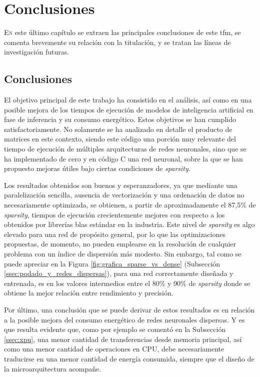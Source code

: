 \chapter{Conclusiones}
\label{chap:conclusiones}

\lettrine{E}{n} este último capítulo se extraen las principales conclusiones de este \acrlong{tfm}, se comenta brevemente su relación con la titulación, y se tratan las líneas de investigación futuras.

\section{Conclusiones}
El objetivo principal de este trabajo ha consistido en el análisis, así como en una posible mejora de los tiempos de ejecución de modelos de inteligencia artificial en fase de inferencia y su consumo energético. Estos objetivos se han cumplido satisfactoriamente. No solamente se ha analizado en detalle el producto de matrices en este contexto, siendo este código una porción muy relevante del tiempo de ejecución de múltiples arquitecturas de redes neuronales, sino que se ha implementado de cero y en código C una red neuronal, sobre la que se han propuesto mejoras útiles bajo ciertas condiciones de \textit{sparsity}.

Los resultados obtenidos son buenos y esperanzadores, ya que mediante una paralelización sencilla, ausencia de vectorización y una ordenación de datos no necesariamente optimizada, se obtienen, a partir de aproximadamente el 87,5\% de \textit{sparsity}, tiempos de ejecución crecientemente mejores con respecto a los obtenidos por librerías \acrshort{blas} estándar en la industria. Este nivel de \textit{sparsity} es algo elevado para una red de propósito general, por lo que las optimizaciones propuestas, de momento, no pueden emplearse en la resolución de cualquier problema con un índice de dispersión más modesto. Sin embargo, tal como se puede apreciar en la Figura \ref{fig:grafica_sparse_vs_dense} (Subsección \ref{ssec:podado_y_redes_dispersas}), para una red correctamente diseñada y entrenada, es en los valores intermedios entre el 80\% y 90\% de \textit{sparsity} donde se obtiene la mejor relación entre rendimiento y precisión.

Por último, una conclusión que se puede derivar de estos resultados es en relación a la posible mejora del consumo energético de redes neuronales dispersas. Y es que resulta evidente que, como por ejemplo se comentó en la Subsección \ref{ssec:xpu}, una menor cantidad de transferencias desde memoria principal, así como una menor cantidad de operaciones en CPU, debe necesariamente traducirse en una menor cantidad de energía consumida, siempre que el diseño de la microarquitectura acompañe.

